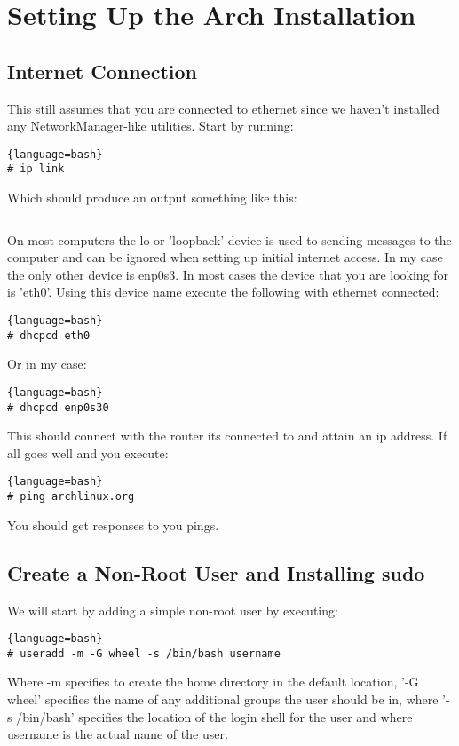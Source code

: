
\section{Setting Up the Arch Installation}
\subsection{Internet Connection}
\label{sec:Internet_Connection}
This still assumes that you are connected to ethernet since we haven't installed any NetworkManager-like utilities.
Start by running:
\begin{lstlisting}{language=bash}
# ip link 
\end{lstlisting}
Which should produce an output something like this:
\inputminted[linenos, fontsize=\small, baselinestretch=0.875, frame=lines]{shell}{Sections/6/iplink.txt}
On most computers the lo or 'loopback' device is used to sending messages to the computer and can be ignored when setting up initial internet access. In my case the only other device is enp0s3. In most cases the device that you are looking for is 'eth0'. Using this device name execute the following with ethernet connected:
\begin{lstlisting}{language=bash}
# dhcpcd eth0
\end{lstlisting}
Or in my case:
\begin{lstlisting}{language=bash}
# dhcpcd enp0s30
\end{lstlisting}
This should connect with the router its connected to and attain an ip address. If all goes well and you execute:
\begin{lstlisting}{language=bash}
# ping archlinux.org
\end{lstlisting}
You should get responses to you pings.

\subsection{Create a Non-Root User and Installing sudo}
We will start by adding a simple non-root user by executing:
\begin{lstlisting}{language=bash}
# useradd -m -G wheel -s /bin/bash username
\end{lstlisting}
Where -m specifies to create the home directory in the default location, '-G wheel' specifies the name of any additional groups the user should be in, where '-s /bin/bash' specifies the location of the login shell for the user and where username is the actual name of the user.

